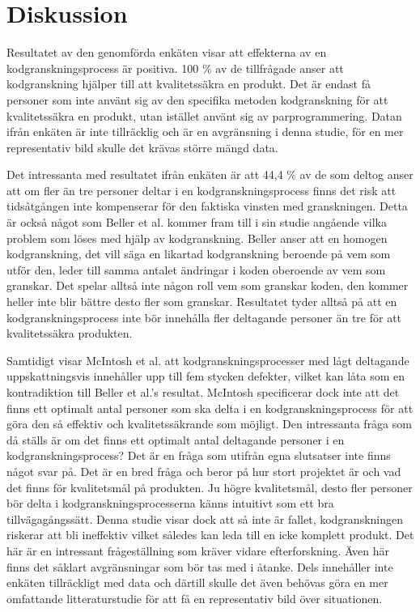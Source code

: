 \section{Diskussion}
\label{sec:discussion-wallstrom}
Resultatet av den genomförda enkäten visar att effekterna av en kodgranskningsprocess är positiva. 100 \% av de tillfrågade anser att kodgranskning hjälper till att kvalitetssäkra en produkt. Det är endast få personer som inte använt sig av den specifika metoden kodgranskning för att kvalitetssäkra en produkt, utan istället använt sig av parprogrammering. Datan ifrån enkäten är inte tillräcklig och är en avgränsning i denna studie, för en mer representativ bild skulle det krävas större mängd data. 

Det intressanta med resultatet ifrån enkäten är att 44,4 \% av de som deltog anser att om fler än tre personer deltar i en kodgranskningsprocess finns det risk att tidsåtgången inte kompenserar för den faktiska vinsten med granskningen. Detta är också något som Beller et al. \cite{beller2014modern} kommer fram till i sin studie angående vilka problem som löses med hjälp av kodgranskning. Beller anser att en homogen kodgranskning, det vill säga en likartad kodgranskning beroende på vem som utför den, leder till samma antalet ändringar i koden oberoende av vem som granskar. Det spelar alltså inte någon roll vem som granskar koden, den kommer heller inte blir bättre desto fler som granskar. Resultatet tyder alltså på att en kodgranskningsprocess inte bör innehålla fler deltagande personer än tre för att kvalitetssäkra produkten. 

Samtidigt visar McIntosh et al. \cite{mcintosh2014impact} att kodgranskningsprocesser med lågt deltagande uppskattningsvis innehåller upp till fem stycken defekter, vilket kan låta som en kontradiktion till Beller et al.'s \cite{beller2014modern} resultat. McIntosh specificerar dock inte att det finns ett optimalt antal personer som ska delta i en kodgranskningsprocess för att göra den så effektiv och kvalitetssäkrande som möjligt. Den intressanta fråga som då ställs är om det finns ett optimalt antal deltagande personer i en kodgranskningsprocess? Det är en fråga som utifrån egna slutsatser inte finns något svar på. Det är en bred fråga och beror på hur stort projektet är och vad det finns för kvalitetsmål på produkten. Ju högre kvalitetsmål, desto fler personer bör delta i kodgranskningsprocesserna känns intuitivt som ett bra tillvägagångssätt. Denna studie visar dock att så inte är fallet, kodgranskningen riskerar att bli ineffektiv vilket således kan leda till en icke komplett produkt. Det här är en intressant frågeställning som kräver vidare efterforskning. Även här finns det såklart avgränsningar som bör tas med i åtanke. Dels innehåller inte enkäten tillräckligt med data och därtill skulle det även behövas göra en mer omfattande litteraturstudie för att få en representativ bild över situationen.

